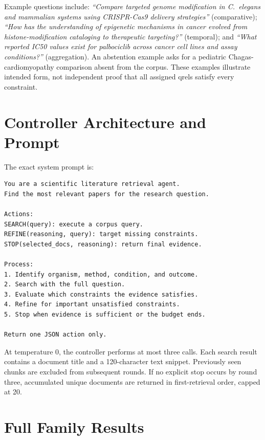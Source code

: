 \documentclass{article}
\begin{document}
Example questions include: \emph{``Compare targeted genome modification in C.~elegans and mammalian systems using CRISPR-Cas9 delivery strategies''} (comparative); \emph{``How has the understanding of epigenetic mechanisms in cancer evolved from histone-modification cataloging to therapeutic targeting?''} (temporal); and \emph{``What reported IC50 values exist for palbociclib across cancer cell lines and assay conditions?''} (aggregation). An abstention example asks for a pediatric Chagas-cardiomyopathy comparison absent from the corpus. These examples illustrate intended form, not independent proof that all assigned qrels satisfy every constraint.

\section{Controller Architecture and Prompt}
\label{app:controller}

The exact system prompt is:
\begin{verbatim}
You are a scientific literature retrieval agent.
Find the most relevant papers for the research question.

Actions:
SEARCH(query): execute a corpus query.
REFINE(reasoning, query): target missing constraints.
STOP(selected_docs, reasoning): return final evidence.

Process:
1. Identify organism, method, condition, and outcome.
2. Search with the full question.
3. Evaluate which constraints the evidence satisfies.
4. Refine for important unsatisfied constraints.
5. Stop when evidence is sufficient or the budget ends.

Return one JSON action only.
\end{verbatim}

At temperature 0, the controller performs at most three calls. Each search result contains a document title and a 120-character text snippet. Previously seen chunks are excluded from subsequent rounds. If no explicit stop occurs by round three, accumulated unique documents are returned in first-retrieval order, capped at 20.

\section{Full Family Results}
\label{app:family}
\end{document}
